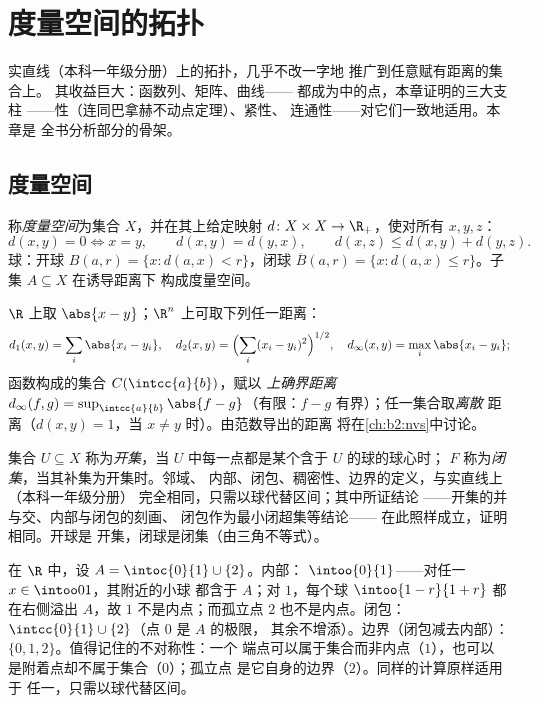 \chapter{度量空间的拓扑}\label{ch:b2:metric}

实直线（本科一年级分册）上的拓扑，几乎不改一字地
推广到任意赋有距离的集合上。
其收益巨大：函数列、矩阵、曲线——
都成为中的点，本章证明的三大支柱
——性（连同巴拿赫不动点定理）、紧性、
连通性——对它们一致地适用。本章是
全书分析部分的骨架。

\section{度量空间}

\begin{definition}\label{def:b2:metric:def}
称\emph{度量空间}为集合 $X$，并在其上给定映射 $d
\colon X \times X \to \R_+$，使对所有 $x, y, z$：
\[
d(x,y) = 0 \iff x = y,
\qquad
d(x,y) = d(y,x),
\qquad
d(x,z) \leq d(x,y) + d(y,z).
\]
球：开球 $B(a, r) = \{x : d(a,x) < r\}$，闭球 $\overline B(a,r) =
\{x : d(a,x) \leq r\}$。子集 $A \subseteq X$ 在诱导距离下
构成度量空间。
\end{definition}

\begin{example}\label{ex:b2:metric:examples}
$\R$ 上取 $\abs{x - y}$；$\R^n$ 上可取下列任一距离：
\[
d_1(x,y) = \sum_i \abs{x_i - y_i},
\quad
d_2(x,y) = \Bigl(\sum_i (x_i - y_i)^2\Bigr)^{1/2},
\quad
d_\infty(x,y) = \max_i \abs{x_i - y_i};
\]
函数构成的集合 $C(\intcc{a}{b})$，赋以
\emph{上确界距离} $d_\infty(f, g) = \sup_{\intcc{a}{b}} \abs{f -
g}$（有限：$f - g$ 有界）；任一集合取\emph{离散}
距离（$d(x,y) = 1$，当 $x \neq y$ 时）。由范数导出的距离
将在\cref{ch:b2:nvs}中讨论。
\end{example}

\begin{definition}[度量空间的拓扑]\label{def:b2:metric:topology}
集合 $U \subseteq X$ 称为\emph{开集}，当
$U$ 中每一点都是某个含于 $U$ 的球的球心时；
$F$ 称为\emph{闭集}，当其补集为开集时。邻域、
内部、闭包、稠密性、边界的定义，与实直线上（本科一年级分册）
完全相同，只需以球代替区间；其中所证结论
——开集的并与交、内部与闭包的刻画、
闭包作为最小闭超集等结论——
在此照样成立，证明相同。开球是
开集，闭球是闭集（由三角不等式）。
\end{definition}

\begin{example}\label{ex:b2:metric:intclosure}
在 $\R$ 中，设 $A = \intoc{0}{1} \cup \{2\}$。内部：
$\intoo{0}{1}$——对任一 $x \in \intoo01$，其附近的小球
都含于 $A$；对 $1$，每个球 $\intoo{1-r}{1+r}$ 都
在右侧溢出 $A$，故 $1$ 不是内点；而孤立点
$2$ 也不是内点。闭包：
$\intcc{0}{1} \cup \{2\}$（点 $0$ 是 $A$ 的极限，
其余不增添）。边界（闭包减去内部）：
$\{0, 1, 2\}$。值得记住的不对称性：一个
端点可以属于集合而非内点（$1$），也可以
是附着点却不属于集合（$0$）；孤立点
是它自身的边界（$2$）。同样的计算原样适用于
任一，只需以球代替区间。
\end{example}

